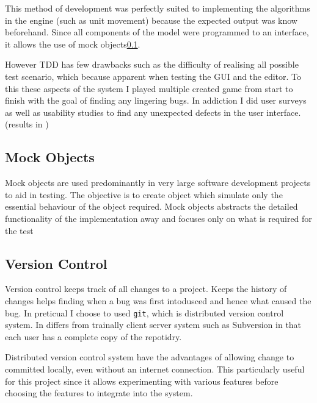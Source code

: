 This method of development was perfectly suited to implementing the algorithms in the engine (such as unit movement) because the expected output was know beforehand.  Since all components of the model were programmed to an interface, it allows the use of mock objects\ref{sec:mockobjects}.   


However TDD has few drawbacks such as the difficulty of realising all possible test scenario, which because apparent when testing the GUI and the editor. To this these aspects of the system I played multiple created game from start to finish with the goal of finding any lingering bugs. In addiction I did user surveys as well as usability studies to find any unexpected defects in the user interface. (results in ) 

\subsection{Mock Objects}
\label{sec:mockobjects}
Mock objects are used predominantly in very large software development projects to aid in testing. The objective is to create object which simulate only the essential behaviour of the object required. 
Mock objects abstracts the detailed functionality of the implementation away and  focuses only on what is required for the test

\subsection{Version Control}
\label{sub:version_control}
Version control keeps track of all changes to a project. Keeps the history of changes helps finding when a bug was first intodusced and hence what caused the bug. In preticual I choose to used \texttt{git}, which is distributed version control system. In differs from trainally client server system such as Subversion in that each user has a 
complete copy of the repotidry. 

Distributed version control system have the advantages of allowing change to committed locally, even without an internet connection.  This particularly useful for this project since it allows experimenting with various features before choosing the features to integrate into the system.
  


